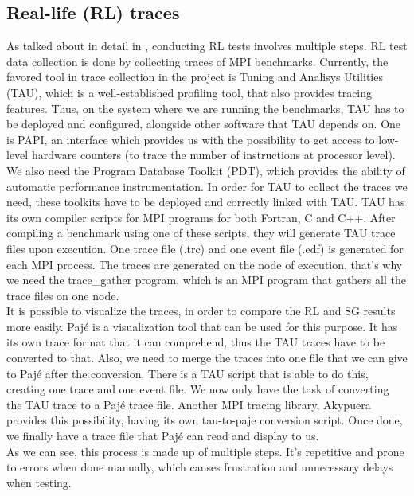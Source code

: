 \subsection{Real-life (RL) traces}
\label{sec:rl_traces}
As talked about in detail in \cite{ms11}, conducting RL tests involves
multiple steps. RL test data collection is done by collecting traces
of MPI benchmarks. Currently, the favored tool in trace collection in
the project is Tuning and Analisys Utilities (TAU)\cite{sm06}, which
is a well-established profiling tool, that also provides tracing
features. Thus, on the system
where we are running the benchmarks, TAU has to be deployed and
configured, alongside other software that TAU depends on. One is
PAPI\cite{mbdh99}\cite{lmmsl01},
an interface which provides us with the possibility to
get access to low-level hardware counters (to trace the number of
instructions at processor level). We also need the Program Database
Toolkit (PDT)\cite{lcmsmrr00}, which provides the ability of automatic
performance
instrumentation. In order for TAU to collect the traces we need, these
toolkits have to be deployed and correctly linked with TAU. TAU has
its own compiler scripts for MPI programs for both Fortran, C and
C++. After compiling a benchmark using one of these scripts, they will
generate TAU trace files upon execution. One trace file (.trc)
and one event file (.edf) is generated for each MPI process. The
traces are generated on the node of execution, that's why we need the
trace\_gather program\cite{ms11}, which is an MPI program that gathers
all the trace files on one node.\\[0.3cm]
It is possible to visualize the traces, in order to compare the RL and SG
results more easily. Pajé\cite{cob00} is a visualization tool that can
be used for this purpose. It has its own trace format that it can
comprehend, thus the TAU traces have to be converted to that. Also, we
need to merge the traces into one file that we can give to Pajé after
the conversion. There is a TAU script that is able to do this,
creating one trace and one event file. We now only have the task of
converting the TAU trace to a Pajé trace file. Another MPI tracing
library, Akypuera\cite{s13} provides this possibility, having its own
tau-to-paje conversion script. Once done, we finally have a trace file
that Pajé can read and display to us.\\[0.3cm]
As we can see, this process is made up of multiple steps. It's
repetitive and prone to errors when done manually, which causes
frustration and unnecessary delays when testing.
